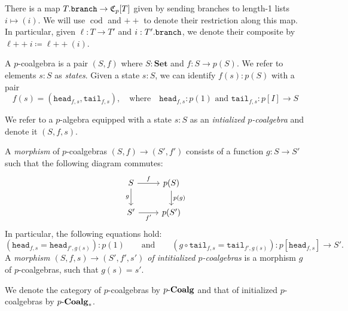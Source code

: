 \documentclass[11pt, one side, article]{memoir}
\theoremstyle{definition}
\theoremstyle{plain}
\newenvironment{definition}
  {\pushQED{\qed}\renewcommand{\qedsymbol}{$\lozenge$}\definitionx}
  {\popQED\enddefinitionx}
\DeclareMathOperator{\cod}{cod}
\newcommand{\Cat}[1]{\mathbf{#1}}%
\newcommand{\tn}[1]{\textnormal{#1}}
\newcommand{\smset}{\Cat{Set}}
\newcommand{\plpl}{\mathbin{+\!\!+}}
\newcommand{\Cofree}{\mathfrak{C}}
\newcommand{\br}{\tn{\texttt{branch}}}
\newcommand{\hd}{\texttt{head}}
\newcommand{\tl}{\texttt{tail}}
\newcommand{\qqand}{\qquad\text{and}\qquad}
\newcommand{\coalg}{\tn{-}\Cat{Coalg}}
\begin{document}
There is a map $T.\br\to\Cofree_p[T]$ given by sending branches to length-1 lists $i\mapsto (i)$. We will use $\cod$ and $\plpl$ to denote their restriction along this map. In particular, given $\ell\colon T\to T'$ and $i:T'.\br$, we denote their composite by $\ell\plpl i\coloneqq\ell\plpl(i)$.

\begin{definition}
A $p$-coalgebra is a pair $(S,f)$ where $S:\smset$ and $f\colon S\to p(S)$. We refer to elements $s:S$ as \emph{states}. Given a state $s:S$, we can identify $f(s):p(S)$ with a pair
\[
f(s)=(\hd_{f,s},\tl_{f,s}),\quad\text{where}\quad \hd_{f,s}:p(1)\text{ and } \tl_{f,s}\colon p[I]\to S
\]

We refer to a $p$-algebra equipped with a state $s:S$ as an \emph{intialized $p$-coalgebra} and denote it $(S,f,s)$.
 
A \emph{morphism} of $p$-coalgebras $(S,f)\to(S',f')$ consists of a function $g\colon S\to S'$ such that the following diagram commutes:
\[
\begin{tikzcd}
	S\ar[r, "f"]\ar[d, "g"']&p(S)\ar[d, "p(g)"]\\
	S'\ar[r, "f'"']&p(S')
\end{tikzcd}
\]
In particular, the following equations hold:
\[
(\hd_{f,s}=\hd_{f',g(s)}):p(1)
\qqand
(g\circ\tl_{f,s}=\tl_{f',g(s)})\colon p[\hd_{f,s}]\to S'.
\]
A \emph{morphism $(S,f,s)\to(S',f',s')$ of intitialized $p$-coalgebras} is a morphism $g$ of $p$-coalgebras, such that $g(s)=s'$. 

We denote the category of $p$-coalgebras by $p\coalg$ and that of initialized $p$-coalgebras by $p\coalg_*$.
\end{definition}
\end{document}
